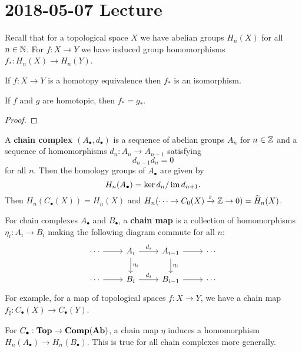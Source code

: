 \section{2018-05-07 Lecture}

Recall that for a topological space $X$ we have abelian groups $H_n(X)$ for all $n \in \mathbb{N}$.
For $f:X \to Y$ we have induced group homomorphisms $f_*: H_n(X) \to H_n(Y)$.

\begin{thm}
  If $f: X \to Y$ is a homotopy equivalence then $f_*$ is an isomorphism.
\end{thm}

\begin{prop}
  If $f$ and $g$ are homotopic, then $f_*=g_*$.
\end{prop}

\begin{proof}
  
\end{proof}

\begin{defn}
  A \textbf{chain complex} $(A_\bullet,d_\bullet)$ is a sequence of abelian groups $A_n$ for $n \in \mathbb{Z}$ and a sequence of homomorphisms $d_n: A_n \to A_{n-1}$ satisfying 
  \[d_{n-1}d_n=0\]
  for all $n$.
  Then the homology groups of $A_\bullet$ are given by
  \[H_n(A_\bullet) = \ker d_n/\operatorname{im} d_{n+1}.\]
  Then $H_n(C_\bullet(X)) = H_n(X)$ and $H_n(\cdots \to C_0(X) \xrightarrow{\varepsilon} \mathbb{Z} \to 0) = \widetilde H_n(X)$.
\end{defn}

\begin{defn}
  For chain complexes $A_\bullet$ and $B_\bullet$, a \textbf{chain map} is a collection of homomorphisms $\eta_i: A_i \to B_i$ making the following diagram commute for all $n$:
  \begin{equation*}
    \begin{tikzcd}
      \cdots \ar[r] & A_i \ar[r, "d_i"] \ar[d, "\eta_i"]  & A_{i-1} \ar[r] \ar[d, "\eta_i"] & \cdots \\
      \cdots \ar[r] & B_i \ar[r, "d_i"] & B_{i-1} \ar[r] & \cdots
    \end{tikzcd}
  \end{equation*}
  For example, for a map of topological spaces $f: X \to Y$, we have a chain map $f_\sharp: C_\bullet(X) \to C_\bullet(Y)$.
\end{defn}

\begin{rmk}
  For $C_\bullet: \mathbf{Top} \to \mathbf{Comp}(\mathbf{Ab})$, a chain map $\eta$ induces a homomorphism $H_n(A_\bullet) \to H_n(B_\bullet)$.
  This is true for all chain complexes more generally.
\end{rmk}

